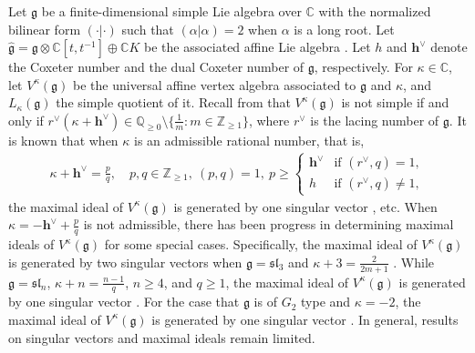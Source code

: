\documentclass[11pt,a4paper]{amsart}
\newcommand{\CC}{\mathbb C}
\newcommand{\ZZ}{\mathbb Z}
\theoremstyle{plain}
\numberwithin{equation}{section}
\def\geq{\geqslant}
\begin{document}
Let $\mathfrak{g}$  be a finite-dimensional simple Lie algebra over $\CC$ with the normalized bilinear form $(\cdot|\cdot)$ such that $(\alpha|\alpha)=2$ when $\alpha$ is  a long root. Let $\widehat{\mathfrak{g}}=\mathfrak{g}\otimes\CC[t,t^{-1}]\oplus \CC K$ be the associated affine Lie algebra \cite{kac1990infinite}. Let $h$ and $\mathbf{h}^\vee$ denote the Coxeter number and the dual Coxeter number of $\mathfrak{g}$, respectively. For $\kappa\in\CC$, let  $V^\kappa(\mathfrak{g})$ be the universal affine vertex algebra associated to $\mathfrak{g}$ and $\kappa$, and  $L_\kappa(\mathfrak{g})$ the simple quotient of it. Recall from \cite{GK07} that $V^\kappa(\mathfrak{g})$ is not simple if and only if $r^\vee(\kappa+\mathbf{h}^\vee)\in\mathbb{Q}_{\geq 0}\setminus\{\frac{1}{m}:m\in\ZZ_{\geq 1}\}$, where $r^\vee$ is the lacing number of $\mathfrak{g}$.  It is known that when $\kappa$ is an admissible rational number, that is, 
	\begin{align*}
	\kappa+\mathbf{h}^\vee=\frac{p}{q},\quad p,q\in \ZZ_{\geq 1}, \ (p,q)=1,\
	p\geq \begin{cases}\mathbf{h}^\vee&\text{if }(r^{\vee},q)=1,\\
		h&\text{if }(r^{\vee},q)\ne 1,
	\end{cases}
\end{align*}
the maximal ideal of $V^\kappa(\mathfrak{g})$ is generated by one singular vector  \cite{kac1990infinite, FZ92,   KW89, LL04,Pe07,Pe08}, etc. When $\kappa=-\mathbf{h}^\vee+\frac{p}{q} $ is not admissible, there has been progress in determining   maximal ideals of $V^\kappa(\mathfrak{g})$ for some special cases. Specifically,   the maximal ideal of $V^\kappa(\mathfrak{g})$ is generated by two singular vectors when $\mathfrak{g}=\mathfrak{sl}_3$ and $\kappa+3=\frac{2}{2m+1}$ \cite{AP08, AKMPP20, JS25} .  While $\mathfrak{g}=\mathfrak{sl}_n$, $\kappa+n=\frac{n-1}{q}$, $n\geq 4$, and $q\geq 1$, the maximal ideal of $V^\kappa(\mathfrak{g})$ is generated by one singular vector \cite{AP08, AM17,APV23,JS25}.  For the case that $\mathfrak{g}$ is of $G_2$ type  and $\kappa=-2$, the  maximal ideal of $V^\kappa(\mathfrak{g})$ is generated by one singular vector \cite{ADFLM25}.  In general,  results on  singular vectors and maximal ideals remain  limited.  
\end{document}
